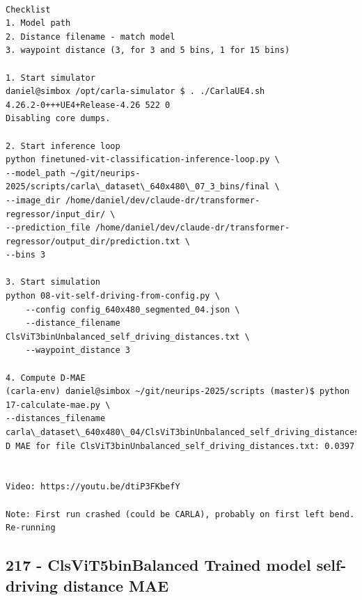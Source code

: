 \begin{verbatim}

Checklist
1. Model path
2. Distance filename - match model
3. waypoint distance (3, for 3 and 5 bins, 1 for 15 bins)

1. Start simulator
daniel@simbox /opt/carla-simulator $ . ./CarlaUE4.sh 
4.26.2-0+++UE4+Release-4.26 522 0
Disabling core dumps.

2. Start inference loop
python finetuned-vit-classification-inference-loop.py \
--model_path ~/git/neurips-2025/scripts/carla\_dataset\_640x480\_07_3_bins/final \
--image_dir /home/daniel/dev/claude-dr/transformer-regressor/input_dir/ \
--prediction_file /home/daniel/dev/claude-dr/transformer-regressor/output_dir/prediction.txt \
--bins 3

3. Start simulation
python 08-vit-self-driving-from-config.py \
    --config config_640x480_segmented_04.json \
    --distance_filename ClsViT3binUnbalanced_self_driving_distances.txt \
    --waypoint_distance 3

4. Compute D-MAE
(carla-env) daniel@simbox ~/git/neurips-2025/scripts (master)$ python 17-calculate-mae.py \
--distances_filename carla\_dataset\_640x480\_04/ClsViT3binUnbalanced_self_driving_distances.txt
D MAE for file ClsViT3binUnbalanced_self_driving_distances.txt: 0.0397


Video: https://youtu.be/dtiP3FKbefY

Note: First run crashed (could be CARLA), probably on first left bend. Re-running

\end{verbatim}    

\subsection{217 - ClsViT5binBalanced Trained model self-driving distance MAE}
\label{app_res:217}


